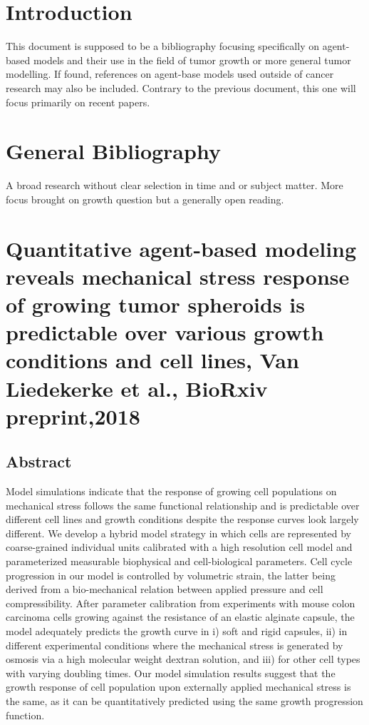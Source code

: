 \documentclass[11pt,a4paper]{article}
\begin{document}
\tableofcontents
{}
\section*{Introduction}
This document is supposed to be a bibliography focusing specifically on agent-based models and their use in the field of tumor growth or more general tumor modelling. If found, references on agent-base models used outside of cancer research may also be included. Contrary to the previous document, this one will focus primarily on recent papers.

\section{General Bibliography}
A broad research without clear selection in time and or subject matter. More focus brought on growth question but a generally open reading.

\section*{Quantitative agent-based modeling reveals mechanical stress response of growing tumor spheroids is predictable over various growth conditions and cell lines, Van Liedekerke et al., BioRxiv preprint,2018}
\subsection*{Abstract}
Model simulations indicate that the response of growing cell populations on mechanical stress follows the same functional relationship and is predictable over different cell lines and growth conditions despite the response curves look largely different. We develop a hybrid model strategy in which cells are represented by coarse-grained individual units calibrated with a high resolution cell model and parameterized measurable biophysical and cell-biological parameters. Cell cycle progression in our model is controlled by volumetric strain, the latter being derived from a bio-mechanical relation between applied pressure and cell compressibility. After parameter calibration from experiments with mouse colon carcinoma cells growing against the resistance of an elastic alginate capsule, the model adequately predicts the growth curve in i) soft and rigid capsules, ii) in different experimental conditions where the mechanical stress is generated by osmosis via a high molecular weight dextran solution, and iii) for other cell types with varying doubling times. Our model simulation results suggest that the growth response of cell population upon externally applied mechanical stress is the same, as it can be quantitatively predicted using the same growth progression function.
\end{document}

